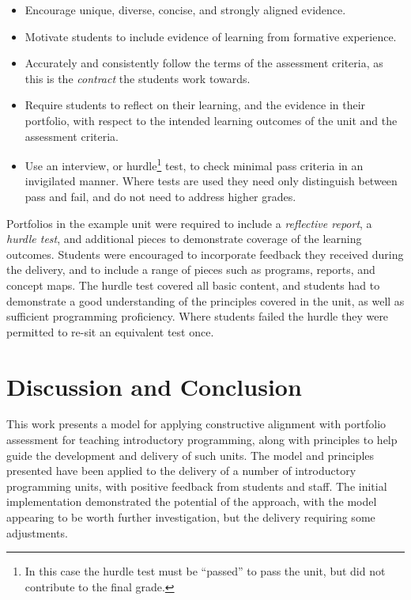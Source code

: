 \begin{itemize}
  \item Encourage unique, diverse, concise, and strongly aligned evidence.
  \item Motivate students to include evidence of learning from formative experience.
  \item Accurately and consistently follow the terms of the assessment criteria, as this is the \emph{contract} the students work towards.
  \item Require students to reflect on their learning, and the evidence in their portfolio, with respect to the intended learning outcomes of the unit and the assessment criteria.
  \item Use an interview, or hurdle\footnote{In this case the hurdle test must be ``passed'' to pass the unit, but did not contribute to the final grade.} test, to check minimal pass criteria in an invigilated manner. Where tests are used they need only distinguish between pass and fail, and do not need to address higher grades. 
\end{itemize}

Portfolios in the example unit were required to include a \emph{reflective report}, a \emph{hurdle test}, and additional pieces to demonstrate coverage of the learning outcomes. Students were encouraged to incorporate feedback they received during the delivery, and to include a range of pieces such as programs, reports, and concept maps. The hurdle test covered all basic content, and students had to demonstrate a good understanding of the principles covered in the unit, as well as sufficient programming proficiency. Where students failed the hurdle they were permitted to re-sit an equivalent test once.







\section{Discussion and Conclusion}

This work presents a model for applying constructive alignment with portfolio assessment for teaching introductory programming, along with principles to help guide the development and delivery of such units. The model and principles presented have been applied to the delivery of a number of introductory programming units, with positive feedback from students and staff. The initial implementation demonstrated the potential of the approach, with the model appearing to be worth further investigation, but the delivery requiring some adjustments. 

